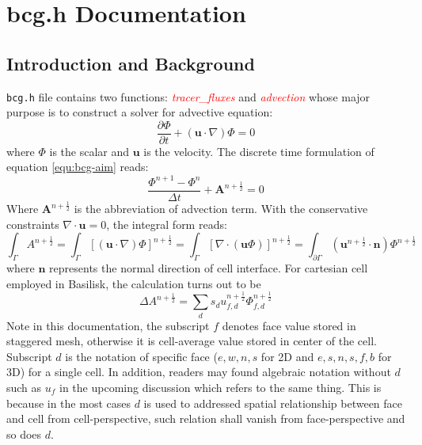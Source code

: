 \chapter{bcg.h Documentation}
\ifsingle
\maketitle
\fi
\chaptermeta[2.0][2025-06-04]

\section{Introduction and Background}\label{sec:bcg-intro}
\texttt{bcg.h} file contains two functions: \textcolor{red}{\emph{tracer\_fluxes}} and \textcolor{red}{\emph{advection}} whose major purpose is to construct a solver for advective equation:
\begin{equation}
  \frac{\partial \Phi}{\partial t} + ( \mathbf{u} \cdot \nabla)\Phi = 0\label{equ:bcg-aim}
\end{equation}
where $\Phi$ is the scalar and $ \mathbf{u}$ is the velocity. The discrete time formulation of equation \ref{equ:bcg-aim} reads:
\begin{equation}
  \frac{\Phi^{n+1}-\Phi^{n}}{\Delta t} + \mathbf{A}^{n+\frac{1}{2}} = 0 \label{equ:bcg-general}
\end{equation}
Where $ \mathbf{A}^{n+ \frac{1}{2}}$ is the abbreviation of advection term. With the conservative constraints $\nabla \cdot \mathbf{u} = 0$, the integral form reads:
\begin{equation}
  \int_{\Gamma} A^{n+ \frac{1}{2}} = \int_{\Gamma} [( \mathbf{u}\cdot \nabla)\Phi]^{n+ \frac{1}{2}} = \int_{\Gamma} [\nabla\cdot( \mathbf{u} \Phi)]^{n+ \frac{1}{2}} = \int_{\partial \Gamma} ( \mathbf{u}^{n + \frac{1}{2}} \cdot \mathbf{n}) \Phi^{n+ \frac{1}{2}}
\end{equation}
where $ \mathbf{n}$ represents the normal direction of cell interface. For cartesian cell employed in Basilisk, the calculation turns out to be
\begin{equation}
  \Delta A^{n+ \frac{1}{2}} = \sum_{d} s_d u_{f,d}^{n+ \frac{1}{2}}\Phi_{f,d}^{n + \frac{1}{2}} 
\end{equation}
Note in this documentation, the subscript $f$ denotes face value stored in staggered mesh\cite{1965_Harlow}, otherwise it is cell-average value stored in center of the cell. Subscript $d$ is the notation of specific face ($e,w,n,s$ for 2D and $e,s,n,s,f,b$ for 3D) for a single cell. In addition, readers may found algebraic notation without $d$ such as $u_f$ in the upcoming discussion which refers to the same thing. This is because in the most cases $d$ is used to addressed spatial relationship between face and cell from cell-perspective, such relation shall vanish from face-perspective and so does $d$.

